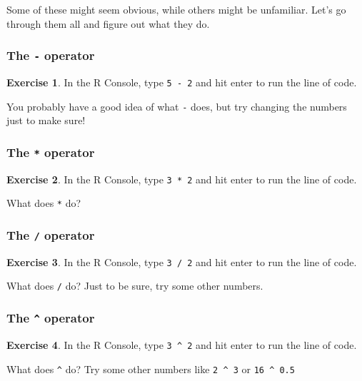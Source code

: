 \documentclass[
]{article}
\theoremstyle{definition}
\theoremstyle{definition}
\theoremstyle{definition}
\newtheorem{exercise}{Exercise}[section]
\theoremstyle{definition}
\theoremstyle{remark}
\begin{document}
Some of these might seem obvious, while others might be unfamiliar.
Let's go through them all and figure out what they do.

\hypertarget{the---operator}{%
\subsubsection{\texorpdfstring{The \texttt{-} operator}{The - operator}}\label{the---operator}}

\begin{exercise}
In the R Console, type \texttt{5\ -\ 2} and hit enter to run the line of code.

You probably have a good idea of what \texttt{-} does, but try changing the numbers
just to make sure!
\end{exercise}

\hypertarget{the-operator}{%
\subsubsection{\texorpdfstring{The \texttt{*} operator}{The * operator}}\label{the-operator}}

\begin{exercise}
In the R Console, type \texttt{3\ *\ 2} and hit enter to run the line of code.

What does \texttt{*} do?
\end{exercise}

\hypertarget{the-operator-1}{%
\subsubsection{\texorpdfstring{The \texttt{/} operator}{The / operator}}\label{the-operator-1}}

\begin{exercise}
In the R Console, type \texttt{3\ /\ 2} and hit enter to run the line of code.

What does \texttt{/} do? Just to be sure, try some other numbers.
\end{exercise}

\hypertarget{the-operator-2}{%
\subsubsection{\texorpdfstring{The \texttt{\^{}} operator}{The \^{} operator}}\label{the-operator-2}}

\begin{exercise}
In the R Console, type \texttt{3\ \^{}\ 2} and hit enter to run the line of code.

What does \texttt{\^{}} do? Try some other numbers like \texttt{2\ \^{}\ 3} or \texttt{16\ \^{}\ 0.5}
\end{exercise}
\end{document}
